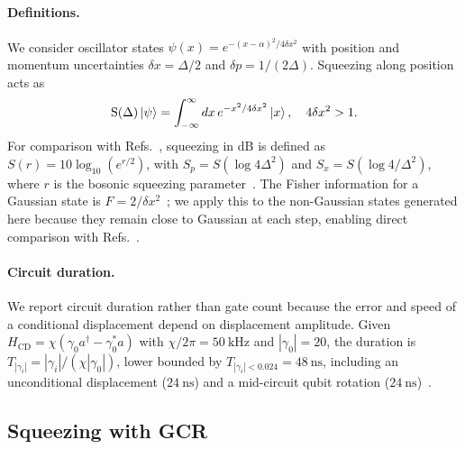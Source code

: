 \documentclass[aps,prx,showpacs,notitlepage,twocolumn,superscriptaddress,nofootinbib,preprintnumbers,floatfix,10pt, longbibliography]{revtex4-2}
\begin{document}
{\paragraph{Definitions.}
We consider oscillator states $\psi(x)=e^{-(x-\alpha)^2/4\delta x^2}$ with
position and momentum uncertainties $\delta x=\Delta/2$ and
$\delta p=1/(2\Delta)$.  Squeezing along position acts as
\begin{align}
  \mathrm{S}(\Delta)\ket{\psi}
  = \int_{-\infty}^{\infty}dx\,e^{-x^2/4\delta x^2}\ket{x},
  \quad 4\delta x^2 > 1.
\end{align}
For comparison with Refs.~\cite{eickbusch2022fast,hastrup2021unconditional},
squeezing in dB is defined as $S(r)=10\log_{10}(e^{r/2})$, with
$S_p=S(\log 4\Delta^2)$ and $S_x=S(\log 4/\Delta^2)$, where $r$ is the
bosonic squeezing parameter~\cite{ISA}.  The Fisher information for a
Gaussian state is $F=2/\delta x^2$~\cite{paris2004quantum}; we apply this
to the non-Gaussian states generated here because they remain close to
Gaussian at each step, enabling direct comparison with
Refs.~\cite{hastrup2021unconditional,eickbusch2022fast}.

\paragraph{Circuit duration.}
We report circuit duration rather than gate count because the error and
speed of a conditional displacement depend on displacement amplitude.
Given $H_\mathrm{CD}=\chi(\gamma_0 a^\dagger-\gamma_0^* a)$ with
$\chi/2\pi=50\ \mathrm{kHz}$ and $|\gamma_0|=20$, the duration is
$T_{|\gamma_i|}=|\gamma_i|/(\chi|\gamma_0|)$, lower bounded by
$T_{|\gamma_i|<0.024}=48\ \mathrm{ns}$, including an unconditional
displacement ($24\ \mathrm{ns}$) and a mid-circuit qubit rotation
($24\ \mathrm{ns}$)~\cite{eickbusch2022fast}.

\subsection{Squeezing with GCR}\label{app:squeezing-gcr}

}
\end{document}

